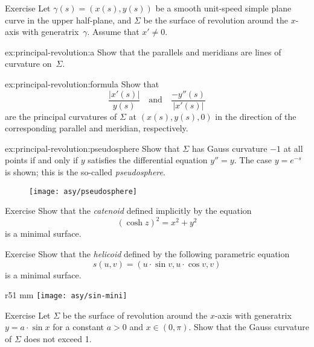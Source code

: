 \begin{thm}{Exercise}\label{ex:principal-revolution}
Let $\gamma(s)=(x(s),y(s))$ be a smooth unit-speed simple plane curve in the upper half-plane,
and $\Sigma$ be the surface of revolution around the $x$-axis with generatrix~$\gamma$.
Assume that $x'\ne 0$.

\begin{subthm}{ex:principal-revolution:a}
Show that the parallels and meridians are lines of curvature on~$\Sigma$.
\end{subthm}

\begin{subthm}{ex:principal-revolution:formula}
Show that 
\[\frac{|x'(s)|}{y(s)}
\quad
\text{and}
\quad
\frac{-y''(s)}{|x'(s)|}
\]
are the principal curvatures of $\Sigma$ at $(x(s),y(s),0)$ in the direction of the corresponding parallel and meridian, respectively.
\end{subthm}

\begin{subthm}{ex:principal-revolution:pseudosphere}
Show that $\Sigma$ has Gauss curvature $-1$ at all points if and only if $y$ satisfies the differential equation $y''=y$. 
The case $y=e^{-s}$ is shown; this is the so-called \emph{pseudosphere}.
\end{subthm}

\end{thm}

\begin{figure}[ht!]
\vskip-0mm
\hskip30mm
\texttt{[image: asy/pseudosphere]}
\vskip-3mm
\end{figure}

\begin{thm}{Exercise}\label{ex:catenoid-is-minimal}
Show that the \emph{catenoid} defined implicitly by the equation
\[(\cosh z)^2=x^2+y^2\]
is a minimal surface.
\end{thm}

\begin{thm}{Exercise}\label{ex:helicoid-is-minimal}
Show that the \emph{helicoid} defined by the following parametric equation
\[s(u,v)=(u\cdot \sin v,u\cdot \cos v,v)\]
is a minimal surface.
\end{thm}

\begin{wrapfigure}{r}{51 mm}
\vskip-6mm
\centering
\texttt{[image: asy/sin-mini]}
\vskip0mm
\end{wrapfigure}

\begin{thm}{Exercise}\label{ex:rev(sin)}
Let $\Sigma$ be the surface of revolution around the $x$-axis
with generatrix $y=a\cdot \sin x$ for a constant $a>0$ and $x\in (0,\pi)$.
Show that the Gauss curvature of $\Sigma$ does not exceed 1.
\end{thm}

